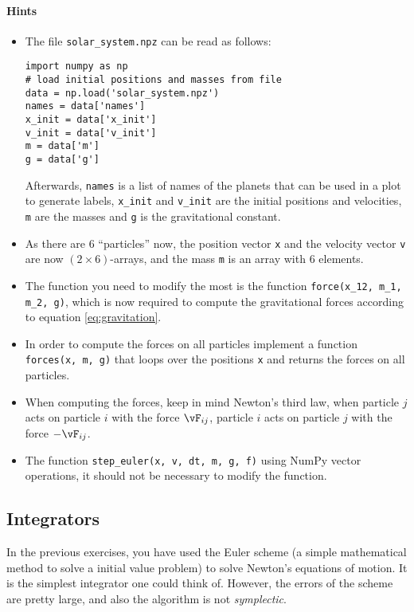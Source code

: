 \paragraph{Hints}
\begin{itemize}
  \item The file  \verb!solar_system.npz! can be read as follows:
    \begin{lstlisting}
import numpy as np
# load initial positions and masses from file
data = np.load('solar_system.npz')
names = data['names']
x_init = data['x_init']
v_init = data['v_init']
m = data['m']
g = data['g']
    \end{lstlisting}
    Afterwards, \lstinline!names! is a list of names of the planets that can be
    used in a plot to generate labels, \lstinline!x_init! and
    \lstinline!v_init! are the initial positions and velocities, \lstinline!m!
    are the masses and \lstinline!g! is the gravitational constant.
  \item As there are $6$ ``particles'' now, the position vector \lstinline!x!
    and the velocity vector \lstinline!v! are now $(2 \times 6)$-arrays, and
    the mass \lstinline!m! is an array with $6$ elements.
  \item The function you need to modify the most is the function
    \lstinline!force(x_12, m_1, m_2, g)!, which is now required to compute the
    gravitational forces according to equation \eqref{eq:gravitation}.
  \item In order to compute the forces on all particles implement a function \lstinline!forces(x, m, g)! that
        loops over the positions \lstinline!x! and returns the forces on all particles.
  \item When computing the forces, keep in mind Newton's third law, \ie when
    particle $j$ acts on particle $i$ with the force $\vF_{ij}$, particle $i$
    acts on particle $j$ with the force $-\vF_{ij}$.
  \item The function \lstinline!step_euler(x, v, dt, m, g, f)! using NumPy vector operations, it
    should not be necessary to modify the function.
\end{itemize}

\subsection{Integrators}

In the previous exercises, you have used the Euler scheme (\ie a
simple mathematical method to solve a initial value problem) to solve
Newton's equations of motion. It is the simplest integrator
one could think of.  However, the errors of the scheme are pretty
large, and also the algorithm is not \emph{symplectic}.

